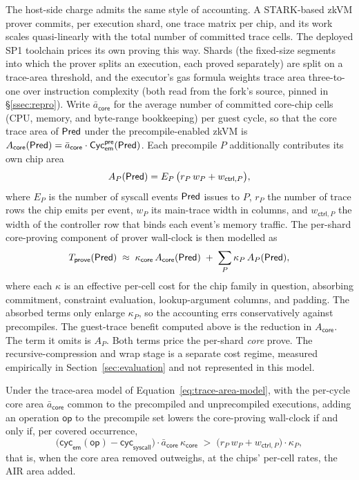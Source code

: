 The host-side charge admits the same style of accounting. A STARK-based zkVM prover commits, per execution shard, one trace matrix per chip, and its work scales quasi-linearly with the total number of committed trace cells. The deployed SP1 toolchain prices its own proving this way. Shards (the fixed-size segments into which the prover splits an execution, each proved separately) are split on a trace-area threshold, and the executor's gas formula weights trace area three-to-one over instruction complexity (both read from the fork's source, pinned in \S\ref{ssec:repro}). Write $\bar a_{\mathsf{core}}$ for the average number of committed core-chip cells (CPU, memory, and byte-range bookkeeping) per guest cycle, so that the core trace area of $\mathsf{Pred}$ under the precompile-enabled zkVM is $A_{\mathsf{core}}(\mathsf{Pred}) = \bar a_{\mathsf{core}}\cdot\mathsf{Cyc}_{\mathsf{em}}^{\mathsf{pre}}(\mathsf{Pred})$. Each precompile $P$ additionally contributes its own chip area
\begin{equation*}
  A_P(\mathsf{Pred}) = E_P\,\bigl(r_P\,w_P + w_{\mathsf{ctrl},P}\bigr),
\end{equation*}
where $E_P$ is the number of syscall events $\mathsf{Pred}$ issues to $P$, $r_P$ the number of trace rows the chip emits per event, $w_P$ its main-trace width in columns, and $w_{\mathsf{ctrl},P}$ the width of the controller row that binds each event's memory traffic. The per-shard core-proving component of prover wall-clock is then modelled as
\begin{equation}\label{eq:trace-area-model}
  T_{\mathsf{prove}}(\mathsf{Pred})
  \;\approx\;
  \kappa_{\mathsf{core}}\,A_{\mathsf{core}}(\mathsf{Pred})
  \;+\;
  \sum_{P}\kappa_P\,A_P(\mathsf{Pred}),
\end{equation}
where each $\kappa$ is an effective per-cell cost for the chip family in question, absorbing commitment, constraint evaluation, lookup-argument columns, and padding. The absorbed terms only enlarge $\kappa_P$, so the accounting errs conservatively against precompiles. The guest-trace benefit computed above is the reduction in $A_{\mathsf{core}}$. The term it omits is $A_P$. Both terms price the per-shard \emph{core} prove. The recursive-compression and wrap stage is a separate cost regime, measured empirically in Section~\ref{sec:evaluation} and not represented in this model. \begin{proposition}\label{prop:precompile-pays}
Under the trace-area model of Equation~\eqref{eq:trace-area-model}, with the per-cycle core area $\bar a_{\mathsf{core}}$ common to the precompiled and unprecompiled executions, adding an operation $\mathsf{op}$ to the precompile set lowers the core-proving wall-clock if and only if, per covered occurrence,
\begin{equation}\label{eq:precompile-pays}
  \bigl(\mathsf{cyc}_{\mathsf{em}}(\mathsf{op}) - \mathsf{cyc}_{\mathsf{syscall}}\bigr)\cdot \bar a_{\mathsf{core}}\,\kappa_{\mathsf{core}}
  \;>\;
  \bigl(r_P\,w_P + w_{\mathsf{ctrl},P}\bigr)\cdot \kappa_P,
\end{equation}
that is, when the core area removed outweighs, at the chips' per-cell rates, the AIR area added.
\end{proposition}
